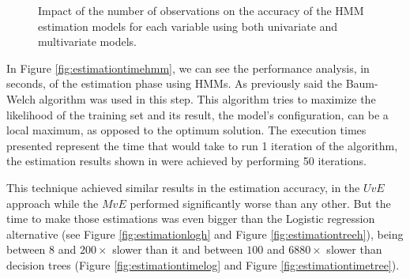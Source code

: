  \begin{figure}[h]
  \begin{subfigmatrix}{2}
  \end{subfigmatrix}
  \caption{Impact of the number of observations on the accuracy of the HMM estimation models for each variable using both univariate and multivariate models.}
  \label{fig:estimationhmm}
\end{figure}
 
 In Figure \ref{fig:estimationtimehmm}, we can see the performance analysis, in seconds, of the estimation phase using HMMs. As previously said the Baum-Welch algorithm was used in this step. This algorithm tries to maximize the likelihood of the training set and its result, the model's configuration, can be a local maximum, as opposed to the optimum solution. The execution times presented represent the time that would take to run 1 iteration of the algorithm, the estimation results shown in were achieved by performing 50 iterations.

This technique achieved similar results in the estimation accuracy, in the $UvE$ approach while the $MvE$ performed significantly worse than any other. But the time to make those estimations was even bigger than the Logistic regression alternative (see Figure \ref{fig:estimationlogh} and Figure \ref{fig:estimationtreeh}), being between $8$ and $200\times$ slower than it and between $100$ and $6880\times$ slower than decision trees (Figure \ref{fig:estimationtimelog} and Figure \ref{fig:estimationtimetree}).
 
